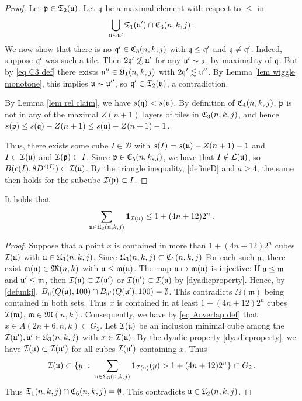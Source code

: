 \begin{proof}
    Let $\fp \in \mathfrak{T}_2(\fu)$. Let $\fq$ be a maximal element with respect to $\le$ in
    $$
        \bigcup_{\fu \sim \fu'} \mathfrak{T}_1(\fu') \cap \fC_3(n,k,j)\,.
    $$
    We now show that there is no $\fq' \in \fC_3(n,k,j)$ with $\fq \le \fq'$ and $\fq \ne \fq'$. Indeed, suppose $\fq'$ was such a tile. Then $2\fq' \not \lesssim \fu'$ for any $\fu' \sim \fu$, by maximality of $\fq$. But by \eqref{eq C3 def} there exists $\fu'' \in \fU_1(n,k,j)$ with $2\fq' \lesssim \fu''$. By Lemma \ref{lem wiggle monotone}, this implies $\fu \sim \fu''$, so $\fq' \in \mathfrak{T}_2(\fu)$, a contradiction.

    By Lemma \ref{lem rel claim}, we have $s(\fq) < s(\fu)$. By definition of $\fC_4(n,k,j)$, $\fp$ is not in any of the maximal $Z(n+1)$ layers of tiles in $\fC_3(n,k,j)$, and hence $s(\fp) \le s(\fq) - Z(n+1) \le s(\fu) - Z(n+1) - 1$.

    Thus, there exists some cube $I \in \mathcal{D}$ with $s(I) = s(\fu) - Z(n+1) - 1$ and $I \subset \sc(\fu)$ and $\sc(\fp) \subset I$. Since $\fp \in \fC_5(n,k,j)$, we have that $I \notin \mathcal{L}(\fu)$, so $B(c(I), 8D^{s(I)}) \subset \sc(\fu)$. By the triangle inequality, \eqref{defineD} and $a \ge 4$, the same then holds for the subcube $\sc(\fp) \subset I$.
\end{proof}


\begin{lemma}
    \label{lem overlap}
    It holds that
    \begin{equation}
        \sum_{\fu \in \fU_3(n,k,j)} \mathbf{1}_{\sc(\fu)} \le 1 + (4n+12)2^{n}\,.
    \end{equation}
\end{lemma}

\begin{proof}
    Suppose that a point $x$ is contained in more than $1 + (4n + 12)2^n$ cubes $\sc(\fu)$ with $\fu \in \fU_3(n,k,j)$. Since $\fU_3(n,k,j) \subset \fC_1(n,k,j)$ For each such $\fu$, there exist $\mathfrak{m}(\fu) \in \mathfrak{M}(n,k)$ with $\fu \le \mathfrak{m}(\fu)$. The map $\fu \mapsto\mathfrak{m}(\fu)$ is injective: If $\fu \le \mathfrak{m}$ and $\fu' \le \mathfrak{m}$, then $\sc(\fu) \subset \sc(\fu')$ or $\sc(\fu') \subset \sc(\fu)$ by \eqref{dyadicproperty}. Hence, by \eqref{defunkj}, $B_{\fu}(Q(\fu),100) \cap B_{\fu'}(Q(\fu'), 100) = \emptyset$. This contradicts $\Omega(\mathfrak{m})$ being contained in both sets. Thus $x$ is contained in at least $1 + (4n + 12)2^n$ cubes $\sc(\mathfrak{m})$, $\mathfrak{m} \in \mathfrak{M}(n,k)$. Consequently, we have by \eqref{eq Aoverlap def} that $x \in A(2n + 6, n,k) \subset G_2$. Let $\sc(\fu)$ be an inclusion minimal cube among the $\sc(\fu'), \fu' \in \fU_3(n,k,j)$ with $x \in \sc(\fu)$. By the dyadic property \eqref{dyadicproperty}, we have $\sc(\fu) \subset \sc(\fu')$ for all cubes $\sc(\fu')$ containing $x$. Thus
    $$
        \sc(\fu) \subset \{y \ : \ \sum_{\fu \in \fU_3(n,k,j)} \mathbf{1}_{\sc(\fu)}(y) > 1 + (4n+12)2^{n}\} \subset G_2\,.
    $$
    Thus $\mathfrak{T}_1(n,k,j) \cap \fC_6(n,k,j) = \emptyset$.
    This contradicts $\fu \in \fU_2(n,k,j)$.
\end{proof}

